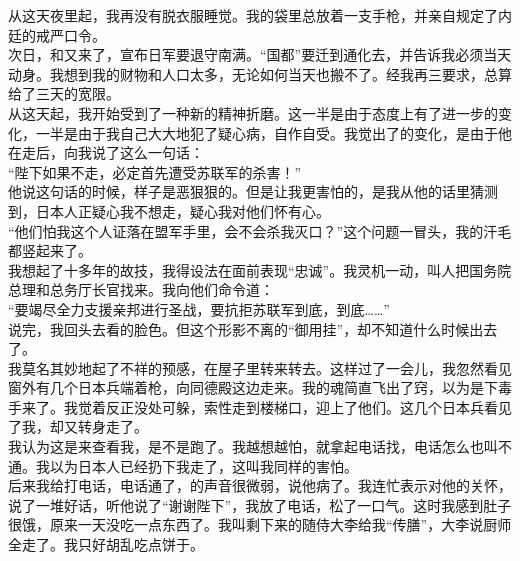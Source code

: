 从这天夜里起，我再没有脱衣服睡觉。我的袋里总放着一支手枪，并亲自规定了内廷的戒严口令。\\

次日，和又来了，宣布日军要退守南满。“国都”要迁到通化去，并告诉我必须当天动身。我想到我的财物和人口太多，无论如何当天也搬不了。经我再三要求，总算给了三天的宽限。\\

从这天起，我开始受到了一种新的精神折磨。这一半是由于态度上有了进一步的变化，一半是由于我自己大大地犯了疑心病，自作自受。我觉出了的变化，是由于他在走后，向我说了这么一句话：\\

“陛下如果不走，必定首先遭受苏联军的杀害！”\\

他说这句话的时候，样子是恶狠狠的。但是让我更害怕的，是我从他的话里猜测到，日本人正疑心我不想走，疑心我对他们怀有心。\\

“他们怕我这个人证落在盟军手里，会不会杀我灭口？”这个问题一冒头，我的汗毛都竖起来了。\\

我想起了十多年的故技，我得设法在面前表现“忠诚”。我灵机一动，叫人把国务院总理和总务厅长官找来。我向他们命令道：\\

“要竭尽全力支援亲邦进行圣战，要抗拒苏联军到底，到底……”\\

说完，我回头去看的脸色。但这个形影不离的“御用挂”，却不知道什么时候出去了。\\

我莫名其妙地起了不祥的预感，在屋子里转来转去。这样过了一会儿，我忽然看见窗外有几个日本兵端着枪，向同德殿这边走来。我的魂简直飞出了窍，以为是下毒手来了。我觉着反正没处可躲，索性走到楼梯口，迎上了他们。这几个日本兵看见了我，却又转身走了。\\

我认为这是来查看我，是不是跑了。我越想越怕，就拿起电话找，电话怎么也叫不通。我以为日本人已经扔下我走了，这叫我同样的害怕。\\

后来我给打电话，电话通了，的声音很微弱，说他病了。我连忙表示对他的关怀，说了一堆好话，听他说了“谢谢陛下”，我放了电话，松了一口气。这时我感到肚子很饿，原来一天没吃一点东西了。我叫剩下来的随侍大李给我“传膳”，大李说厨师全走了。我只好胡乱吃点饼于。\\

